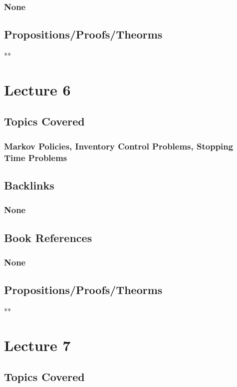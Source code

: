 \documentclass[11pt]{article}
\begin{document}
\subsubsection*{None}
\label{sec:org2f8bf1d}
\subsection*{Propositions/Proofs/Theorms}
\label{sec:org96197ea}
**

\section*{Lecture 6}
\label{sec:org177bde9}
\subsection*{Topics Covered}
\label{sec:org563d6a2}
\subsubsection*{Markov Policies, Inventory Control Problems, Stopping Time Problems}
\label{sec:orgd2e120f}
\subsection*{Backlinks}
\label{sec:org75b5665}
\subsubsection*{None}
\label{sec:org4a48cad}
\subsection*{Book References}
\label{sec:org65e81a6}
\subsubsection*{None}
\label{sec:org612ab3b}
\subsection*{Propositions/Proofs/Theorms}
\label{sec:orgf2b82df}
**

\section*{Lecture 7}
\label{sec:orgaeaaaf7}
\subsection*{Topics Covered}
\label{sec:org6ddd920}
\end{document}
